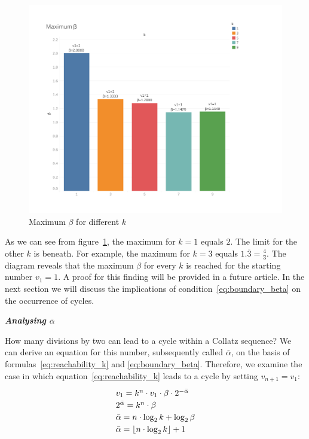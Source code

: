 \documentclass{SciPress_2015}
\renewcommand{\subsection}[1]{\textit{\textbf{#1}}}
\begin{document}
\begin{figure}[h]
	\includegraphics[trim=40 45 60 40, clip, width=1.00\textwidth]{figures/beta_dashboard.pdf}
	\caption{Maximum $\beta$ for different $k$}
	\label{fig:1}
\end{figure}

As we can see from figure~\ref{fig:1}, the maximum for $k=1$ equals $2$. The limit for the other $k$ is beneath. For example, the maximum for $k=3$ equals $1.\overline{3}=\frac{4}{3}$. The diagram reveals that the maximum $\beta$ for every $k$ is reached for the starting number $v_1=1$. A proof for this finding will be provided in a future article. In the next section we will discuss the implications of condition~\ref{eq:boundary_beta} on the occurrence of cycles.

\vspace{1em}\noindent
\subsection{Analysing \boldmath$\bar\alpha$}
\par\noindent
How many divisions by two can lead to a cycle within a Collatz sequence? We can derive an equation for this number, subsequently called $\bar\alpha$, on the basis of formulas~\ref{eq:reachability_k} and \ref{eq:boundary_beta}. Therefore, we examine the case in which equation~\ref{eq:reachability_k} leads to a cycle by setting $v_{n+1}=v_1$:
\begin{equation}
\label{eq:cycle_alpha}
\def\arraystretch{1.2}\begin{array}{l}
	v_1=k^n\cdot v_1\cdot\beta\cdot2^{-\bar\alpha}\\
	2^{\bar\alpha}=k^n\cdot\beta\\
	\bar\alpha=n\cdot\log_2k+\log_2\beta\\
	\bar\alpha=\lfloor n\cdot\log_2k\rfloor+1
\end{array}
\end{equation}
\end{document}
